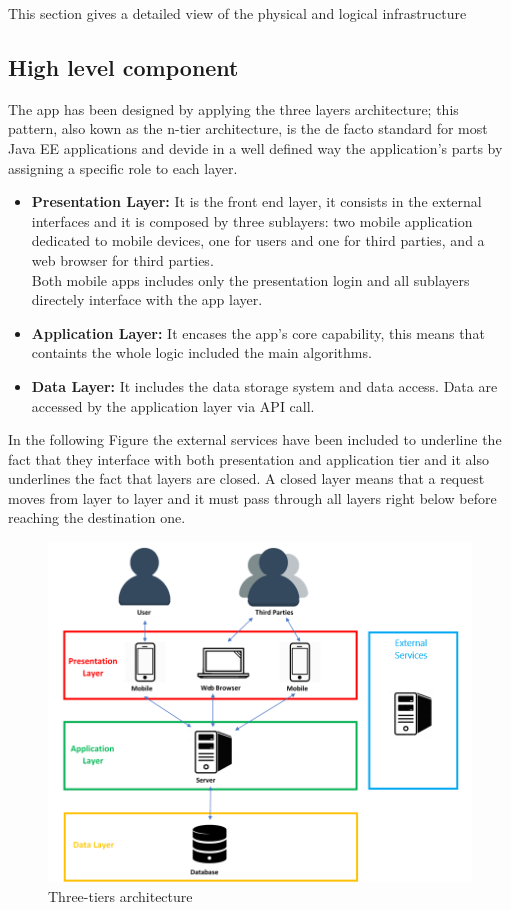 This section gives a detailed view of the physical and logical infrastructure

\subsection{High level component}
The app has been designed by applying the three layers architecture; this pattern, also kown as the n-tier architecture, is the de facto standard for most Java EE applications and devide in a well defined way the application's parts  by assigning a specific role to each layer.
\begin{itemize}
	\item \textbf{Presentation Layer:} It is the front end layer, it consists in the external interfaces and it is composed by three 			sublayers: two mobile application  dedicated to mobile devices, one for users and one for third parties, and a web browser for 			third parties.\\ Both mobile apps  includes only the presentation login and all sublayers directely interface with the app layer.
	\item \textbf{Application Layer:} It encases the app's core capability, this means that containts the whole logic included the main 		algorithms. 
	\item \textbf{Data Layer:} It includes the data storage system and data access. Data are accessed by the application layer 			via API call.
\end{itemize}In the following Figure the external services have been included to underline the fact that they interface with both presentation and application tier and it also underlines the fact that layers are closed. A closed layer means that a request moves from layer to layer and it  must pass through all layers right below before reaching the destination one.

\begin{figure}[h!]
	\includegraphics[width=1.0\textwidth]{./pictures/design_arch.png}\par
	\caption{Three-tiers architecture}
\end{figure}
\FloatBarrier

